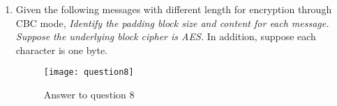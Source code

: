 \documentclass[a4paper,12pt]{article}
\begin{document}
\begin{enumerate}
\begin{enumerate}[label=\roman*.]
{					to the left.}
				\item {\em Suppose each item in the array cell is just one byte.}
				\item {\em  Make sure that you append the padding block before encrypting.}
			\end{enumerate}
			\begin{figure}[h!]
				\centering
				\texttt{[image: question7]}
				\caption{Answer to question 7}
				\label{fig:question7}
			\end{figure}
		\item Given the following messages with different length for encryption through CBC mode,
			\emph{Identify the padding block size and content for each message. Suppose the
			underlying block cipher is AES.} In addition, suppose each character is one byte.
			\begin{figure}[h!]
				\centering
				\texttt{[image: question8]}
				\caption{Answer to question 8}
				\label{fig:question8}
			\end{figure}

		\end{enumerate}
\end{document}
